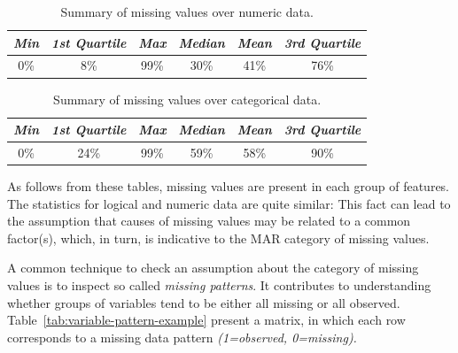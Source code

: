  \begin{table}[h!]
  \begin{center}
    \caption{Summary of missing values over numeric data.}
    \label{tab:missings-over-numeric}
    \begin{tabular}{|c|c|c|c|c|c|}\hline
     \textit{Min} & \textit{1st Quartile}& \textit{Max} & \textit{Median} & \textit{Mean} & \textit{3rd Quartile} \\
      \hline
     0\% & 8\% & 99\% & 30\% & 41\% & 76\% \\ 
     \hline 
    \end{tabular}
  \end{center}
\end{table}
   

 \begin{table}[h!]
  \begin{center}
    \caption{Summary of missing values over categorical data.}
    \label{tab:missings-over-categorical}
    \begin{tabular}{|c|c|c|c|c|c|}\hline
      \textit{Min} & \textit{1st Quartile}& \textit{Max} & \textit{Median} & \textit{Mean} & \textit{3rd Quartile} \\
      \hline
     0\% & 24\% & 99\% & 59\% & 58\% & 90\% \\ 
     \hline 
    \end{tabular}
  \end{center}
\end{table}

As follows from these tables, missing values are present in each group of features. The statistics for logical and numeric data are quite similar: This fact can lead to the assumption that causes of missing values may be related to a common factor(s), which, in turn, is indicative to the MAR category of missing values.

A common technique to check an assumption about the category of missing values is to inspect so called \textit{missing patterns}. It contributes to understanding whether groups of variables tend to be either all missing or all observed. Table~\ref{tab:variable-pattern-example} present a matrix, in which each row corresponds to a missing data pattern \textit{(1=observed, 0=missing).} 

